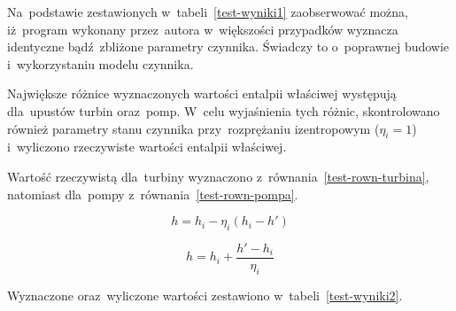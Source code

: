 Na~podstawie zestawionych w~tabeli~\ref{test-wyniki1} zaobserwować
można, iż~program wykonany przez~autora w~większości przypadków wyznacza
identyczne bądź~zbliżone parametry czynnika. Świadczy to o~poprawnej
budowie i~wykorzystaniu modelu czynnika.

Największe różnice wyznaczonych wartości entalpii właściwej występują
dla~upustów turbin oraz~pomp. W~celu wyjaśnienia tych różnic,
skontrolowano również parametry stanu czynnika przy~rozprężaniu
izentropowym ($\eta_i = 1$) i~wyliczono rzeczywiste wartości entalpii
właściwej.

Wartość rzeczywistą dla~turbiny wyznaczono
z~równania~\eqref{test-rown-turbina}, natomiast dla~pompy
z~równania~\eqref{test-rown-pompa}.

\begin{equation}
	\label{test-rown-turbina}
	h = h_i - \eta_i ( h_i - h' )
\end{equation}

\begin{equation}
	\label{test-rown-pompa}
	h = h_i + \frac{ h' - h_i }{ \eta_i }
\end{equation}

Wyznaczone oraz~wyliczone wartości zestawiono
w~tabeli~\ref{test-wyniki2}.

